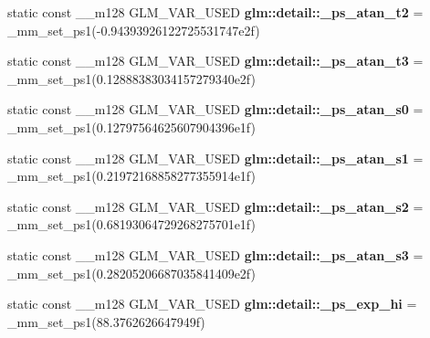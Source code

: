 \begin{DoxyCompactItemize}
\item 
\hypertarget{namespaceglm_1_1detail_a46826e9117f932bb57242e0523a2c2b6}{}static const \+\_\+\+\_\+m128 G\+L\+M\+\_\+\+V\+A\+R\+\_\+\+U\+S\+E\+D {\bfseries glm\+::detail\+::\+\_\+ps\+\_\+atan\+\_\+t2} = \+\_\+mm\+\_\+set\+\_\+ps1(-\/0.\+94393926122725531747e2f)\label{namespaceglm_1_1detail_a46826e9117f932bb57242e0523a2c2b6}

\item 
\hypertarget{namespaceglm_1_1detail_a5f8805f796957bfd520c073f6995de77}{}static const \+\_\+\+\_\+m128 G\+L\+M\+\_\+\+V\+A\+R\+\_\+\+U\+S\+E\+D {\bfseries glm\+::detail\+::\+\_\+ps\+\_\+atan\+\_\+t3} = \+\_\+mm\+\_\+set\+\_\+ps1(0.\+12888383034157279340e2f)\label{namespaceglm_1_1detail_a5f8805f796957bfd520c073f6995de77}

\item 
\hypertarget{namespaceglm_1_1detail_a775fc3c45c8581dea0707d8b96533f7e}{}static const \+\_\+\+\_\+m128 G\+L\+M\+\_\+\+V\+A\+R\+\_\+\+U\+S\+E\+D {\bfseries glm\+::detail\+::\+\_\+ps\+\_\+atan\+\_\+s0} = \+\_\+mm\+\_\+set\+\_\+ps1(0.\+12797564625607904396e1f)\label{namespaceglm_1_1detail_a775fc3c45c8581dea0707d8b96533f7e}

\item 
\hypertarget{namespaceglm_1_1detail_a90c5074cdb18021877950de61ac6bcbc}{}static const \+\_\+\+\_\+m128 G\+L\+M\+\_\+\+V\+A\+R\+\_\+\+U\+S\+E\+D {\bfseries glm\+::detail\+::\+\_\+ps\+\_\+atan\+\_\+s1} = \+\_\+mm\+\_\+set\+\_\+ps1(0.\+21972168858277355914e1f)\label{namespaceglm_1_1detail_a90c5074cdb18021877950de61ac6bcbc}

\item 
\hypertarget{namespaceglm_1_1detail_ad18134904d171379373b5570670ced9a}{}static const \+\_\+\+\_\+m128 G\+L\+M\+\_\+\+V\+A\+R\+\_\+\+U\+S\+E\+D {\bfseries glm\+::detail\+::\+\_\+ps\+\_\+atan\+\_\+s2} = \+\_\+mm\+\_\+set\+\_\+ps1(0.\+68193064729268275701e1f)\label{namespaceglm_1_1detail_ad18134904d171379373b5570670ced9a}

\item 
\hypertarget{namespaceglm_1_1detail_abd6802bcbd1a5f3c290d5e45f6b41e68}{}static const \+\_\+\+\_\+m128 G\+L\+M\+\_\+\+V\+A\+R\+\_\+\+U\+S\+E\+D {\bfseries glm\+::detail\+::\+\_\+ps\+\_\+atan\+\_\+s3} = \+\_\+mm\+\_\+set\+\_\+ps1(0.\+28205206687035841409e2f)\label{namespaceglm_1_1detail_abd6802bcbd1a5f3c290d5e45f6b41e68}

\item 
\hypertarget{namespaceglm_1_1detail_a5ba2203ea1edc9dc6631c8b1a1033c61}{}static const \+\_\+\+\_\+m128 G\+L\+M\+\_\+\+V\+A\+R\+\_\+\+U\+S\+E\+D {\bfseries glm\+::detail\+::\+\_\+ps\+\_\+exp\+\_\+hi} = \+\_\+mm\+\_\+set\+\_\+ps1(88.\+3762626647949f)\label{namespaceglm_1_1detail_a5ba2203ea1edc9dc6631c8b1a1033c61}


\end{DoxyCompactItemize}
